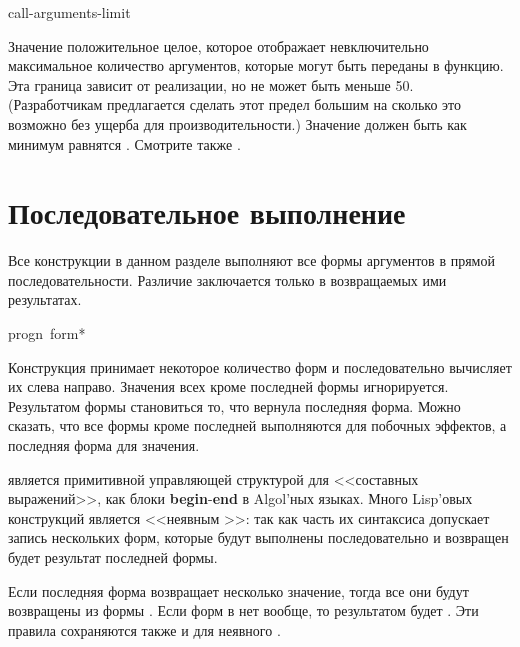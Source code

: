 \begin{defun}[Constant]
call-arguments-limit

Значение  положительное целое, которое отображает
невключительно максимальное количество аргументов, которые могут быть переданы в
функцию. Эта граница зависит от реализации, но не может быть меньше 50.
(Разработчикам предлагается сделать этот предел большим на сколько это возможно
без ущерба для производительности.)
Значение  должен быть как минимум равнятся
.
Смотрите также .
\end{defun}

\section{Последовательное выполнение}

Все конструкции в данном разделе выполняют все формы аргументов в прямой
последовательности. Различие заключается только в возвращаемых ими результатах.

\begin{defspec}
progn {\,form}*

Конструкция  принимает некоторое количество форм и последовательно
вычисляет их слева направо. Значения всех кроме последней формы
игнорируется. Результатом формы  становиться то, что вернула
последняя форма.
Можно сказать, что все формы кроме последней выполняются для побочных эффектов,
а последняя форма для значения.

 является примитивной управляющей структурой для <<составных
выражений>>, как блоки \textbf{begin}-\textbf{end} в Algol'ных языках.
Много Lisp'овых конструкций является <<неявным >>:
так как часть их синтаксиса допускает запись нескольких форм,
которые будут выполнены последовательно и возвращен будет результат последней
формы.

Если последняя форма  возвращает несколько значение, тогда все они
будут возвращены из формы . Если форм в  нет вообще, то
результатом будет {\false}. Эти правила сохраняются также и для неявного
.
\end{defspec}

